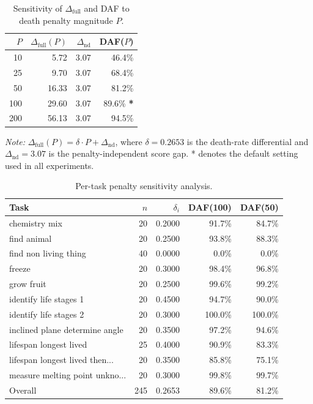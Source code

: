 \begin{table}[t]
\centering
\caption{Sensitivity of $\Delta_{\text{full}}$ and DAF to death penalty magnitude $P$.}
\label{tab:penalty-sensitivity}
\begin{tabular}{rrrr}
\toprule
$P$ & $\Delta_{\text{full}}(P)$ & $\Delta_{\text{nd}}$ & DAF($P$) \\
\midrule
10 & 5.72 & 3.07 & 46.4\% \\
25 & 9.70 & 3.07 & 68.4\% \\
50 & 16.33 & 3.07 & 81.2\% \\
100 & 29.60 & 3.07 & 89.6\% \textbf{*} \\
200 & 56.13 & 3.07 & 94.5\% \\
\bottomrule
\end{tabular}
\vspace{0.5em}
\parbox{0.9\linewidth}{\small\textit{Note:} $\Delta_{\text{full}}(P) = \delta \cdot P + \Delta_{\text{nd}}$, where $\delta = 0.2653$ is the death-rate differential and $\Delta_{\text{nd}} = 3.07$ is the penalty-independent score gap. * denotes the default setting used in all experiments.}
\end{table}

\begin{table}[t]
\centering
\caption{Per-task penalty sensitivity analysis.}
\label{tab:per-task-penalty}
\begin{tabular}{lrrrr}
\toprule
Task & $n$ & $\delta_i$ & DAF(100) & DAF(50) \\
\midrule
chemistry mix & 20 & 0.2000 & 91.7\% & 84.7\% \\
find animal & 20 & 0.2500 & 93.8\% & 88.3\% \\
find non living thing & 40 & 0.0000 & 0.0\% & 0.0\% \\
freeze & 20 & 0.3000 & 98.4\% & 96.8\% \\
grow fruit & 20 & 0.2500 & 99.6\% & 99.2\% \\
identify life stages 1 & 20 & 0.4500 & 94.7\% & 90.0\% \\
identify life stages 2 & 20 & 0.3000 & 100.0\% & 100.0\% \\
inclined plane determine angle & 20 & 0.3500 & 97.2\% & 94.6\% \\
lifespan longest lived & 25 & 0.4000 & 90.9\% & 83.3\% \\
lifespan longest lived then... & 20 & 0.3500 & 85.8\% & 75.1\% \\
measure melting point unkno... & 20 & 0.3000 & 99.8\% & 99.7\% \\
\midrule
Overall & 245 & 0.2653 & 89.6\% & 81.2\% \\
\bottomrule
\end{tabular}
\end{table}
